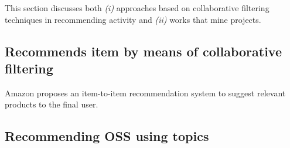 This section discusses both \emph{(i)} approaches based on collaborative filtering techniques in recommending activity and \emph{(ii)} works that mine \GH projects. 

\subsection{Recommends item by means of collaborative filtering}
Amazon \cite{Linden:2003:ARI:642462.642471} proposes an item-to-item recommendation system to suggest relevant products to the final user.

\subsection{Recommending OSS using \GH topics}
